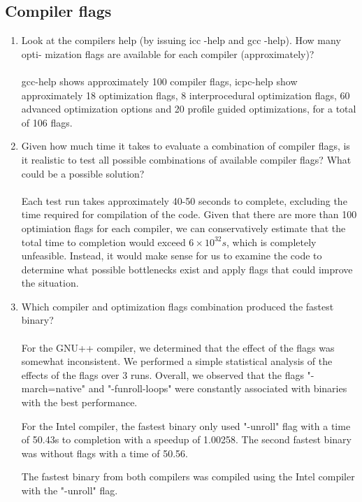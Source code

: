 \documentclass{article}
\begin{document}
\subsection{Compiler flags}
\begin{enumerate}
\item{Look at the compilers help (by issuing icc -help and gcc -help). How many opti-
mization flags are available for each compiler (approximately)?}\\\\
gcc-help shows approximately 100 compiler flags, icpc-help show approximately 18 optimization flags, 8 interprocedural optimization flags, 60 advanced optimization options and 20 profile guided optimizations, for a total of 106 flags.
\item{Given how much time it takes to evaluate a combination of compiler flags, is it realistic to test all possible combinations of available compiler flags? What could be a possible solution?}\\\\
 Each test run takes approximately 40-50 seconds to complete, excluding the time required for compilation of the code. Given that there are more than 100 optimiation flags for each compiler, we can conservatively estimate that the total time to completion would exceed $6\times10^{32}s$, which is completely unfeasible. Instead, it would make sense for us to examine the code to determine what possible bottlenecks exist and apply flags that could improve the situation. 
\item{Which compiler and optimization flags combination produced the fastest binary?}\\\\
For the GNU++ compiler, we determined that the effect of the flags was somewhat inconsistent. We performed a simple statistical analysis of the effects of the flags over 3 runs. Overall, we observed that the flags "-march=native" and "-funroll-loops" were constantly associated with binaries with the best performance.

For the Intel compiler, the fastest binary only used "-unroll" flag with a time of 50.43s to completion with a speedup of 1.00258. The second fastest binary was without flags with a time of 50.56.

The fastest binary from both compilers was compiled using the Intel compiler with the "-unroll" flag.
\end{enumerate}
\end{document}
